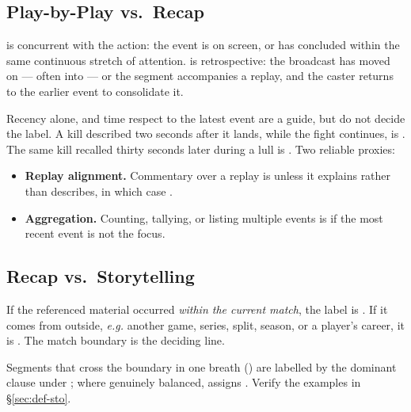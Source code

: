 \subsection{Play-by-Play vs.\ Recap}
\label{sec:b-pbp-rec}

\begin{agrulebox}
 \PBP{} is concurrent with the action: the event is on screen, or has concluded within the same continuous stretch of attention. \REC{} is retrospective: the broadcast has moved on --- often into \SA{} --- or the segment accompanies a replay, and the caster returns to the earlier event to consolidate it.
\end{agrulebox}

\noindent Recency alone, and time respect to the latest event are a guide, but do not decide the label. A kill described two seconds after it lands, while the fight continues, is \PBP{}. The same kill recalled thirty seconds later during a lull is \REC{}. Two reliable proxies:

\begin{itemize}
  \item \textbf{Replay alignment.} Commentary over a replay is \REC{} unless it explains rather than describes, in which case \SA{}.
  \item \textbf{Aggregation.} Counting, tallying, or listing multiple events is \REC{} if the most recent event is not the focus.
\end{itemize}

\subsection{Recap vs.\ Storytelling}
\label{sec:b-rec-sto}

\begin{agrulebox}
 If the referenced material occurred \emph{within
the current match}, the label is \REC{}. If it comes from outside, \textit{e.g.} another game, series, split, season, or a player's career, it is
\STO{}. The match boundary is the deciding line.
\end{agrulebox}

\noindent Segments that cross the boundary in one breath
() are
labelled by the dominant clause under ; where genuinely
balanced,  assigns \STO{}. Verify the examples in \S\ref{sec:def-sto}.

